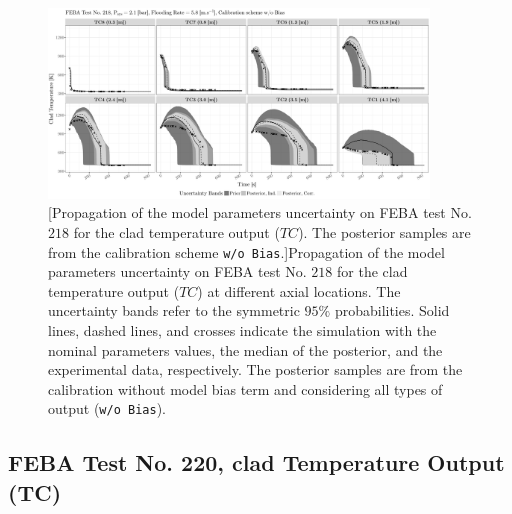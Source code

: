 \clearpage
\begin{figure}
	\centering
	\includegraphics[width=0.90\textwidth]{../figures/chapter5/figures/plotTraceUQPosteriorAllNoDiscNoBCTC218}
		[Propagation of the model parameters uncertainty on FEBA test No. $218$ for the clad temperature output ($TC$). The posterior samples are from the calibration scheme \texttt{w/o Bias}.]{Propagation of the model parameters uncertainty on FEBA test No. $218$ for the clad temperature output ($TC$) at different axial locations. The uncertainty bands refer to the symmetric $95\%$ probabilities. Solid lines, dashed lines, and crosses indicate the simulation with the nominal parameters values, the median of the posterior, and the experimental data, respectively. The posterior samples are from the calibration without model bias term and considering all types of output (\texttt{w/o Bias}).}
	\label{fig:ch5_plot_trace_uq_post_tc_218_nodisc}
\end{figure}
\clearpage

\subsection{FEBA Test No. 220, clad Temperature Output (TC)}\label{app:tbl_results_uq_post_tc_220}

